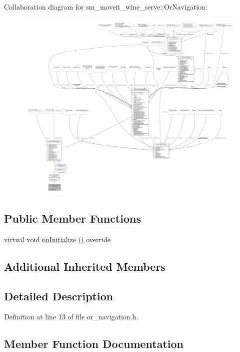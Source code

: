 Collaboration diagram for sm\+\_\+moveit\+\_\+wine\+\_\+serve\+:\+:Or\+Navigation\+:
\nopagebreak
\begin{figure}[H]
\begin{center}
\leavevmode
\includegraphics[width=350pt]{classsm__moveit__wine__serve_1_1OrNavigation__coll__graph}
\end{center}
\end{figure}
\subsection*{Public Member Functions}
\begin{DoxyCompactItemize}
\item 
virtual void \hyperlink{classsm__moveit__wine__serve_1_1OrNavigation_ad26e97111e185d8d4e048479809a684a}{on\+Initialize} () override
\end{DoxyCompactItemize}
\subsection*{Additional Inherited Members}


\subsection{Detailed Description}


Definition at line 13 of file or\+\_\+navigation.\+h.



\subsection{Member Function Documentation}
\mbox{\label{classsm__moveit__wine__serve_1_1OrNavigation_ad26e97111e185d8d4e048479809a684a}} 
